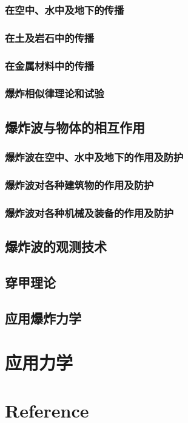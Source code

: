 \documentclass[UTF8]{../06-Physics}
\begin{document}
    \subsection{在空中、水中及地下的传播}
    \subsection{在土及岩石中的传播}
    \subsection{在金属材料中的传播}
    \subsection{爆炸相似律理论和试验} 


\section{爆炸波与物体的相互作用}
    \subsection{爆炸波在空中、水中及地下的作用及防护}
    \subsection{爆炸波对各种建筑物的作用及防护}
    \subsection{爆炸波对各种机械及装备的作用及防护}

\section{爆炸波的观测技术}
\section{穿甲理论}
\section{应用爆炸力学}



\chapter{应用力学}







\chapter{Reference}
\end{document}
